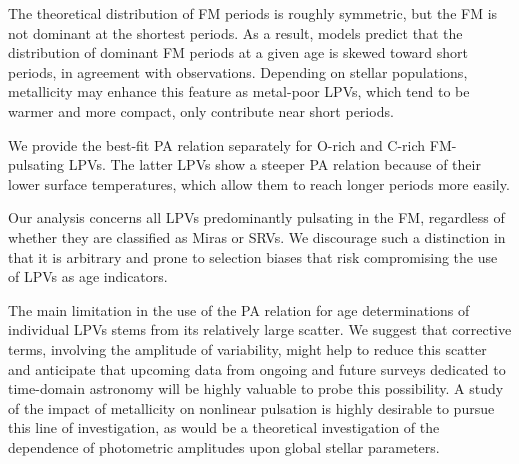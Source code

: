 \documentclass[letter]{aa}
\begin{document}
The theoretical distribution of FM periods is roughly symmetric, but the FM is not dominant at the shortest periods. As a result, models predict that the distribution of dominant FM periods at a given age is skewed toward short periods, in agreement with observations. Depending on stellar populations, metallicity may enhance this feature as metal-poor LPVs, which tend to be warmer and more compact, only contribute near short periods.

We provide the best-fit PA relation separately for O-rich and C-rich FM-pulsating LPVs. The latter LPVs show a steeper PA relation because of their lower surface temperatures, which allow them to reach longer periods more easily.

Our analysis concerns all LPVs predominantly pulsating in the FM, regardless of whether they are classified as Miras or SRVs. We discourage such a distinction in that it is arbitrary and prone to selection biases that risk compromising the use of LPVs as age indicators.

The main limitation in the use of the PA relation for age determinations of individual LPVs stems from its relatively large scatter. We suggest that corrective terms, involving the amplitude of variability, might help to reduce this scatter and anticipate that upcoming data from ongoing and future surveys dedicated to time-domain astronomy will be highly valuable to probe this possibility. A study of the impact of metallicity on nonlinear pulsation is highly desirable to pursue this line of investigation, as would be a theoretical investigation of the dependence of photometric amplitudes upon global stellar parameters.
\end{document}
